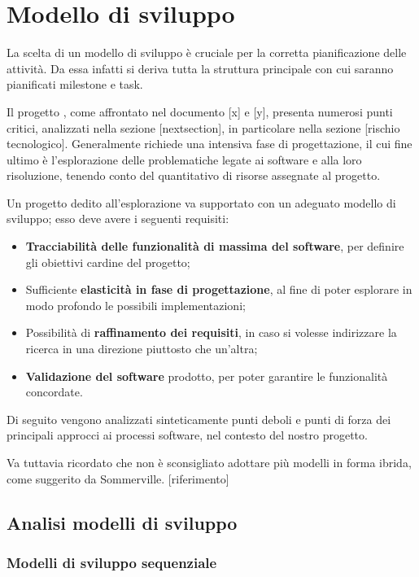\section{Modello di sviluppo}

	La scelta di un modello di sviluppo è cruciale per la corretta pianificazione delle attività. Da essa infatti si deriva tutta la struttura principale con cui saranno pianificati milestone e task.

	Il progetto {\proj}, come affrontato nel documento [x] e [y], presenta numerosi punti critici, analizzati nella sezione [nextsection], in particolare nella sezione [rischio tecnologico]. Generalmente {\proj} richiede una intensiva fase di progettazione, il cui fine ultimo è l'esplorazione delle problematiche legate ai software  e alla loro risoluzione, tenendo conto del quantitativo di risorse assegnate al progetto. %

	Un progetto dedito all'esplorazione va supportato con un adeguato modello di sviluppo; esso deve avere i seguenti requisiti:

	\begin{itemize}
		\item \textbf{Tracciabilità delle funzionalità di massima del software}, per definire gli obiettivi cardine del progetto;
		\item Sufficiente \textbf{elasticità in fase di progettazione}, al fine di poter esplorare in modo profondo le possibili implementazioni;
		\item Possibilità di \textbf{raffinamento dei requisiti}, in caso si volesse indirizzare la ricerca in una direzione piuttosto che un'altra;
		\item \textbf{Validazione del software} prodotto, per poter garantire le funzionalità concordate.
	\end{itemize}

	Di seguito vengono analizzati sinteticamente punti deboli e punti di forza dei principali approcci ai processi software, nel contesto del nostro progetto.
	
	Va tuttavia ricordato che non è sconsigliato adottare più modelli in forma ibrida, come suggerito da Sommerville. [riferimento]

	\subsection{Analisi modelli di sviluppo}

		\subsubsection{Modelli di sviluppo sequenziale}

